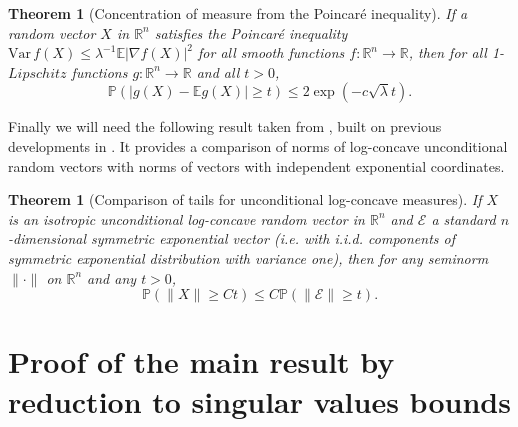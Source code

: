\documentclass[12pt,reqno]{amsart}
\newtheorem{theorem}[lemma]{Theorem}
\begin{document}
\begin{theorem}[Concentration of measure from the Poincar\'e
  inequality]\label{thm:concentration} If a random vector $X$ in ${\mathbb{R}}^n$
  satisfies the Poincar\'e inequality ${\mathrm{Var}\,} f(X) \le \lambda^{-1}{\mathbb{E}}|\nabla
  f(X)|^2$ for all smooth functions $f \colon {\mathbb{R}}^n \to {\mathbb{R}}$, then for all
  1-$Lipschitz$ functions $g\colon {\mathbb{R}}^n \to {\mathbb{R}}$ and all $t > 0$,
  \[
  {\mathbb{P}}(|g(X)-{\mathbb{E}} g(X)| \ge t) \le 2\exp(-c\sqrt{\lambda}t).
  \]
\end{theorem}

Finally we will need the following result taken from \cite{LatalaWeakDom},
built on previous developments in \cite{BobkovNazarovUnc}. It provides a
comparison of norms of log-concave unconditional random vectors with norms of
vectors with independent exponential coordinates.

\begin{theorem}[Comparison of tails for unconditional log-concave
  measures]\label{thm:Latala}
  If $X$ is an isotropic unconditional log-concave random vector in ${\mathbb{R}}^n$ and
  $\mathcal{E}$ a standard $n$-dimensional symmetric exponential vector (i.e.
  with i.i.d. components of symmetric exponential distribution with variance
  one), then for any seminorm $\|\cdot\|$ on ${\mathbb{R}}^n$ and any $t > 0$,
  \[
  {\mathbb{P}}(\|X\| \ge Ct) \le C{\mathbb{P}}(\|\mathcal{E}\| \ge t).
  \]
\end{theorem}

\section{Proof of the main result by reduction to singular values
  bounds}\label{sec:reduction}
\end{document}
